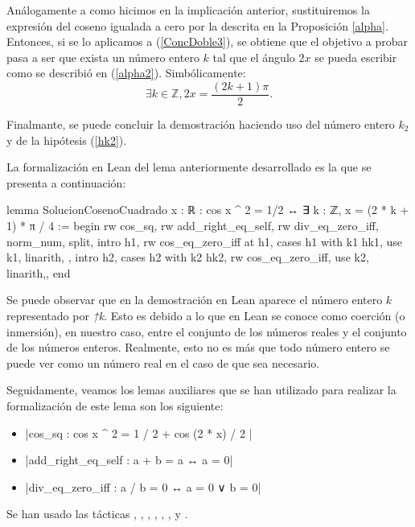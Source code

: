 \begin{demostracion}
    Análogamente a como hicimos en la implicación anterior,
    sustituiremos la expresión del coseno igualada a cero por la
    descrita en la Proposición \ref{alpha}. Entonces, si se lo aplicamos
    a (\ref{ConcDoble3}), se obtiene que el objetivo a probar pasa a ser
    que exista un número entero \(k\) tal que el ángulo \(2x\) se pueda
    escribir como se describió en (\ref{alpha2}). Simbólicamente:
    \begin{equation}
      ∃ k∈ ℤ, 2x = \frac{(2k+1)π}{2}.
    \end{equation}

    Finalmante, se puede concluir la demostración haciendo uso del
    número entero \(k_2\) y de la hipótesis (\ref{hk2}).
\end{demostracion}

La formalización en Lean del lema anteriormente desarrollado es
la que se presenta a continuación:
\begin{leancode}
lemma SolucionCosenoCuadrado
  {x : ℝ}
  : cos x ^ 2 = 1/2 ↔ ∃ k : ℤ, x = (2 * k + 1) * π / 4 :=
begin
  rw cos_sq,
  rw add_right_eq_self,
  rw div_eq_zero_iff,
  norm_num,
  split,
  { intro h1,
    rw cos_eq_zero_iff at h1,
    cases h1 with k1 hk1,
    use k1,
    linarith, },
  { intro h2,
    cases h2 with k2 hk2,
    rw cos_eq_zero_iff,
    use k2,
    linarith,},
end
\end{leancode}

Se puede observar que en la demostración en Lean aparece el número
entero \(k\) representado por \textit{↑k}. Esto es debido a lo que en
Lean se conoce como coerción (o inmersión), en nuestro caso, entre el
conjunto de los números reales y el conjunto de los números
enteros. Realmente, esto no es más que todo número entero se puede ver
como un número real en el caso de que sea necesario.

Seguidamente, veamos los lemas auxiliares que se han utilizado
para realizar la formalización de este lema son los siguiente:
\begin{itemize}
\item {}|cos_sq : cos x ^ 2 = 1 / 2 + cos (2 * x) / 2 |
\item {}|add_right_eq_self : a + b = a ↔ a = 0|
\item {}|div_eq_zero_iff : a / b = 0 ↔ a = 0 ∨ b = 0|
\end{itemize}
Se han usado las tácticas
,
,
,
,
,
,
 y
.

